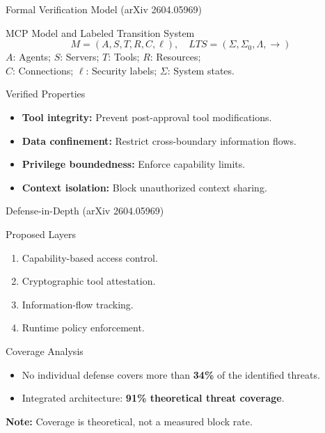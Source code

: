 \documentclass[aspectratio=169]{beamer}
\begin{document}
\begin{frame}{Formal Verification Model (arXiv 2604.05969)}
    \begin{block}{MCP Model and Labeled Transition System}
        \[M=(A,S,T,R,C,\ell),\quad LTS=(\Sigma,\Sigma_0,\Lambda,\rightarrow)\]
        \small
        $A$: Agents; $S$: Servers; $T$: Tools; $R$: Resources;\\
        $C$: Connections; $\ell$: Security labels; $\Sigma$: System states.
    \end{block}
    \begin{block}{Verified Properties}
        \begin{itemize}
            \item \textbf{Tool integrity:} Prevent post-approval tool modifications.
            \item \textbf{Data confinement:} Restrict cross-boundary information flows.
            \item \textbf{Privilege boundedness:} Enforce capability limits.
            \item \textbf{Context isolation:} Block unauthorized context sharing.
        \end{itemize}
    \end{block}
\end{frame}

\begin{frame}{Defense-in-Depth (arXiv 2604.05969)}
    \small
    \begin{block}{Proposed Layers}
        \begin{enumerate}
            \item Capability-based access control.
            \item Cryptographic tool attestation.
            \item Information-flow tracking.
            \item Runtime policy enforcement.
        \end{enumerate}
    \end{block}
    \begin{block}{Coverage Analysis}
        \begin{itemize}
            \item No individual defense covers more than \textbf{34\%} of the identified threats.
            \item Integrated architecture: \textbf{91\% theoretical threat coverage}.
        \end{itemize}
    \end{block}
    \small\textbf{Note:} Coverage is theoretical, not a measured block rate.
\end{frame}
\end{document}
